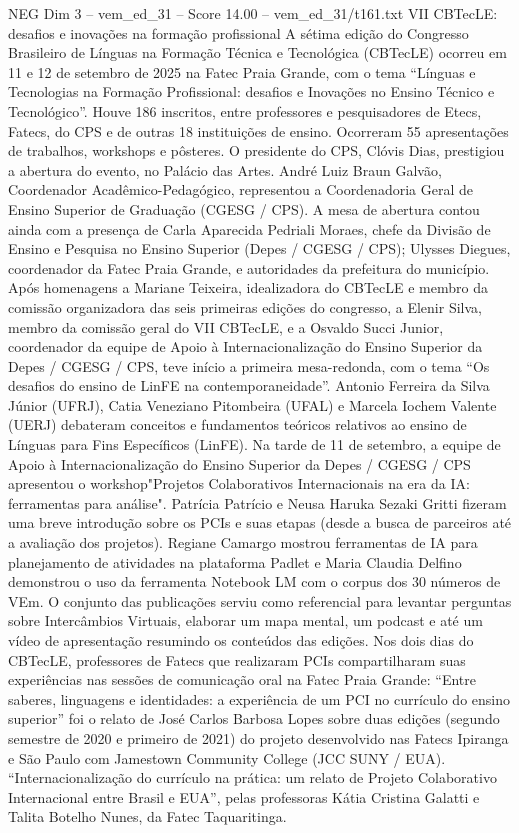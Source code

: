 \begin{textsample}{NEG Dim 3 – vem\_ed\_31 – Score 14.00 – vem\_ed\_31/t161.txt}  \label{ex:f3_neg_144}
VII CBTecLE: desafios e inovações na formação profissional A sétima edição do Congresso Brasileiro de Línguas na Formação Técnica e Tecnológica (CBTecLE) ocorreu em 11 e 12 de setembro de 2025 na Fatec Praia Grande, com o tema “Línguas e Tecnologias na Formação Profissional: desafios e Inovações no Ensino Técnico e Tecnológico”.
Houve 186 inscritos, entre professores e pesquisadores de Etecs, Fatecs, do CPS e de outras 18 instituições de ensino.
Ocorreram 55 apresentações de trabalhos, workshops e pôsteres.
O presidente do CPS, Clóvis Dias, prestigiou a abertura do evento, no Palácio das Artes.
André Luiz Braun Galvão, Coordenador Acadêmico-Pedagógico, representou a Coordenadoria Geral de Ensino Superior de Graduação (CGESG / CPS).
A mesa de abertura contou ainda com a presença de Carla Aparecida Pedriali Moraes, chefe da Divisão de Ensino e Pesquisa no Ensino Superior (Depes / CGESG / CPS); Ulysses Diegues, coordenador da Fatec Praia Grande, e autoridades da prefeitura do município.
Após homenagens a Mariane Teixeira, idealizadora do CBTecLE e membro da comissão organizadora das seis primeiras edições do congresso, a Elenir Silva, membro da comissão geral do VII CBTecLE, e a Osvaldo Succi Junior, coordenador da equipe de Apoio à Internacionalização do Ensino Superior da Depes / CGESG / CPS, teve início a primeira mesa-redonda, com o tema “Os desafios do ensino de LinFE na contemporaneidade”.
Antonio Ferreira da Silva Júnior (UFRJ), Catia Veneziano Pitombeira (UFAL) e Marcela Iochem Valente (UERJ) debateram conceitos e fundamentos teóricos relativos ao ensino de Línguas para Fins Específicos (LinFE).
Na tarde de 11 de setembro, a equipe de Apoio à Internacionalização do Ensino Superior da Depes / CGESG / CPS apresentou o workshop"Projetos Colaborativos Internacionais na era da IA: ferramentas para análise".
Patrícia Patrício e Neusa Haruka Sezaki Gritti fizeram uma breve introdução sobre os PCIs e suas etapas (desde a busca de parceiros até a avaliação dos projetos).
Regiane Camargo mostrou ferramentas de IA para planejamento de atividades na plataforma Padlet e Maria Claudia Delfino demonstrou o uso da ferramenta Notebook LM com o corpus dos 30 números de VEm.
O conjunto das publicações serviu como referencial para levantar perguntas sobre Intercâmbios Virtuais, elaborar um mapa mental, um podcast e até um vídeo de apresentação resumindo os conteúdos das edições.
Nos dois dias do CBTecLE, professores de Fatecs que realizaram PCIs compartilharam suas experiências nas sessões de comunicação oral na Fatec Praia Grande: “Entre saberes, linguagens e identidades: a experiência de um PCI no currículo do ensino superior” foi o relato de José Carlos Barbosa Lopes sobre duas edições (segundo semestre de 2020 e primeiro de 2021) do projeto desenvolvido nas Fatecs Ipiranga e São Paulo com Jamestown Community College (JCC SUNY / EUA). “Internacionalização do currículo na prática: um relato de Projeto Colaborativo Internacional entre Brasil e EUA”, pelas professoras Kátia Cristina Galatti e Talita Botelho Nunes, da Fatec Taquaritinga.

\end{textsample}

